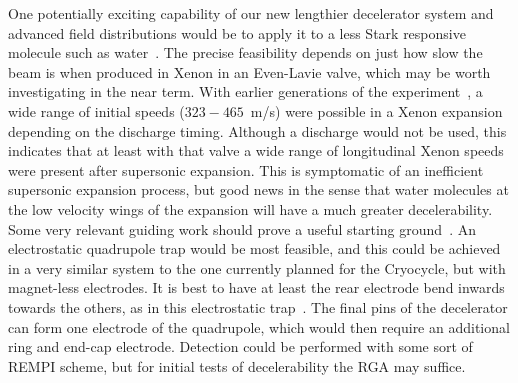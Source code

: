 One potentially exciting capability of our new lengthier decelerator system and advanced field distributions would be to apply it to a less Stark responsive molecule such as water~\citep[Sec.~2.4]{VanDeMeerakker2006thesis}.
The precise feasibility depends on just how slow the beam is when produced in Xenon in an Even-Lavie valve, which may be worth investigating in the near term.
With earlier generations of the experiment~\citep[Fig.~4]{Bochinski2004}, a wide range of initial speeds ($323-465$~m/s) were possible in a Xenon expansion depending on the discharge timing.
Although a discharge would not be used, this indicates that at least with that valve a wide range of longitudinal Xenon speeds were present after supersonic expansion.
This is symptomatic of an inefficient supersonic expansion process, but good news in the sense that water molecules at the low velocity wings of the expansion will have a much greater decelerability.
Some very relevant guiding work should prove a useful starting ground~\cite{Motsch2009}.
An electrostatic quadrupole trap would be most feasible, and this could be achieved in a very similar system to the one currently planned for the Cryocycle, but with magnet-less electrodes.
It is best to have at least the rear electrode bend inwards towards the others, as in this electrostatic trap~\cite{Veldhoven2006}.
The final pins of the decelerator can form one electrode of the quadrupole, which would then require an additional ring and end-cap electrode.
Detection could be performed with some sort of REMPI scheme, but for initial tests of decelerability the RGA may suffice.

\ifx\justbeingincluded\undefined

\fi



